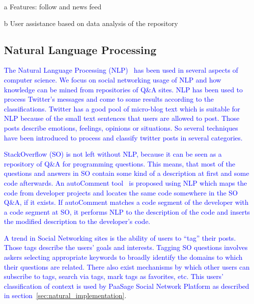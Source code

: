 \begin{table*}[h]
\begin{threeparttable}
\begin{tabular}{c|c|c|c|c|c|c|c|c|c|cc}
\end{tabular}

\begin{tablenotes}
      \small
       \item[a] Features: follow and news feed
      \item[b] User assistance based on data analysis of the repository
\end{tablenotes}
\end{threeparttable}
\end{table*}

\subsection{Natural Language Processing}
\textcolor{blue}{The Natural Language Processing (NLP)~\cite{manning1999foundations} has been used in several aspects of computer science. We focus on social networking usage of NLP and how knowledge can be mined from repositories of Q\&A sites. NLP has been used to process Twitter's messages and come to some results according to the classifications. Twitter has a good pool of micro-blog text which is suitable for NLP because of the small text sentences that users are allowed to post. Those posts describe emotions, feelings, opinions or situations. So several techniques~\cite{pak2010twitter}~\cite{verma2011natural}~\cite{go2009twitter} have been introduced to process and classify twitter posts in several categories.} 

\textcolor{blue}{StackOverflow (SO) is not left without NLP, because it can be seen as a repository of Q\&A for programming questions. This means, that most of the questions and answers in SO contain some kind of a description at first and some code afterwards.    
An autoComment tool~\cite{wong2013autocomment} is proposed using NLP which maps the code from developer projects and locates the same code somewhere in the SO Q\&A, if it exists. If autoComment matches a code segment of the developer with a code segment at SO, it performs NLP to the description of the code and inserts the modified description to the developer's code. }

\textcolor{blue}{A trend in Social Networking sites is the ability of users to ``tag'' their posts. Those tags describe the users' goals and interests. Tagging SO questions involves askers selecting appropriate keywords to broadly identify the domains
to which their questions are related. There also exist mechanisms by which other users can subscribe to tags, search via
tags, mark tags as favorites, etc. This users' classification of context is used by PaaSage Social Network Platform as described in section~\ref{sec:natural_implementation}}. 

